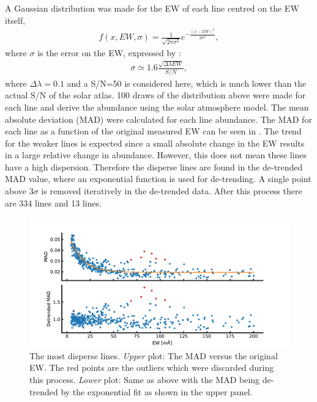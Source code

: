 A Gaussian distribution was made for the EW of each line centred on the EW itself,
\begin{align}
  f(x, EW, \sigma) = \frac{1}{\sqrt{2\pi\sigma^2}} e^{-\frac{(x-EW)^2}{2\sigma^2}},
\end{align}
where $\sigma$ is the error on the EW, expressed by \citet{Caryel1988}:
\begin{align}
  \sigma \simeq 1.6 \frac{\sqrt{\Delta\lambda EW}}{S/N},
\end{align}
where $\Delta\lambda=0.1$ and a S/N=50 is considered here, which is much lower than the actual S/N
of the solar atlas. 100 draws of the distribution above were made for each line and derive the
abundance using the solar atmosphere model. The mean absolute deviation (MAD) were calculated for
each line abundance. The MAD for each line as a function of the original measured EW can be seen in
. The trend for the weaker lines is expected since a small absolute
change in the EW results in a large relative change in abundance. However, this does not mean these
lines have a high dispersion. Therefore the disperse lines are found in the de-trended MAD value,
where an exponential function is used for de-trending. A single point above $3\sigma$ is removed
iteratively in the de-trended data. After this process there are 334  lines and 13
 lines.

\begin{figure}[htpb!]
    \centering
    \includegraphics[width=1.0\linewidth]{figures/disperse_lines.pdf}
    \caption{The most disperse lines. \emph{Upper} plot: The MAD versus the original EW. The red
             points are the outliers which were discarded during this process. \emph{Lower} plot:
             Same as above with the MAD being de-trended by the exponential fit as shown in the
             upper panel.}
    \label{fig:dispersive_lines}
\end{figure}



